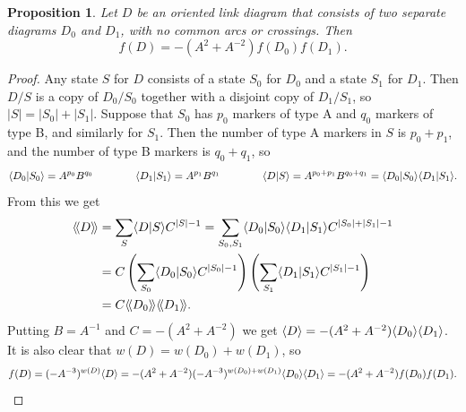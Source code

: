 \documentclass[reqno]{amsart}
\newtheorem{proposition}[theorem]{Proposition}
\theoremstyle{definition}
\begin{document}
\begin{proposition}
 Let $D$ be an oriented link diagram that consists of two separate
 diagrams $D_0$ and $D_1$, with no common arcs or crossings.  Then 
 \[ f(D) = -(A^2+A^{-2}) f(D_0) f(D_1). \]
\end{proposition}
\begin{proof}
 Any state $S$ for $D$ consists of a state $S_0$ for $D_0$ and a state
 $S_1$ for $D_1$.  Then $D/S$ is a copy of $D_0/S_0$ together with a
 disjoint copy of $D_1/S_1$, so $|S|=|S_0|+|S_1|$.  Suppose that $S_0$
 has $p_0$ markers of type A and $q_0$ markers of type B, and
 similarly for $S_1$.  Then the number of type A markers in $S$ is
 $p_0+p_1$, and the number of type B markers is $q_0+q_1$, so 
 \[ \langle D_0|S_0\rangle=A^{p_0}B^{q_0} \hspace{4em}
    \langle D_1|S_1\rangle=A^{p_1}B^{q_1} \hspace{4em}
    \langle D|S\rangle=A^{p_0+p_1}B^{q_0+q_1}=\langle D_0|S_0\rangle\langle D_1|S_1\rangle.
 \]
 From this we get
 \begin{align*}
  \langle\!\langle D\rangle\!\rangle &= \sum_S \langle D|S\rangle C^{|S|-1} 
          = \sum_{S_0,S_1} \langle D_0|S_0\rangle\langle D_1|S_1\rangle C^{|S_0|+|S_1|-1}
          \\
  &= C\left(\sum_{S_0}\langle D_0|S_0\rangle C^{|S_0|-1}\right)
      \left(\sum_{S_1}\langle D_1|S_1\rangle C^{|S_1|-1}\right) \\
  &= C\langle\!\langle D_0\rangle\!\rangle\langle\!\langle D_1\rangle\!\rangle.
 \end{align*}
 Putting $B=A^{-1}$ and $C=-(A^2+A^{-2})$ we get
 $\langle D\rangle=-(A^2+A^{-2})\langle D_0\rangle\langle D_1\rangle$.  It is also clear that
 $w(D)=w(D_0)+w(D_1)$, so 
 \[ f(D) = (-A^{-3})^{w(D)}\langle D\rangle = 
     -(A^2+A^{-2})(-A^{-3})^{w(D_0)+w(D_1)}\langle D_0\rangle\langle D_1\rangle = 
     -(A^2+A^{-2}) f(D_0)f(D_1).
 \]
\end{proof}
\end{document}
